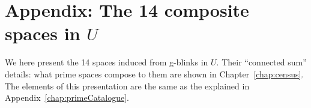 \section{Appendix: The 14 composite spaces in $U$}
\label{chap:compositeCatalogue}

We here present the 14 spaces induced from g-blinks in $U$.
Their ``connected sum'' details: what prime spaces compose to
them are shown in Chapter~\ref{chap:census}. The elements of
this presentation are the same as the explained in
Appendix~\ref{chap:primeCatalogue}.


\newpage
\setlength{\topmargin}{-1.2cm}

